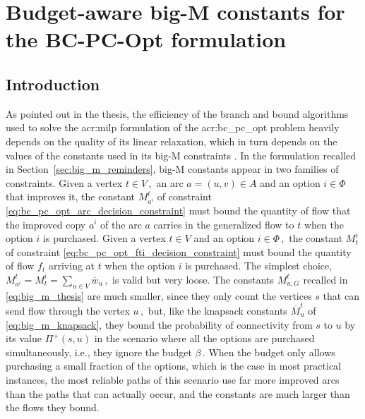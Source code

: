 \documentclass[11pt,a4paper]{report}
\theoremstyle{definition}
\theoremstyle{remark}
\begin{document}
\chapter{Budget-aware big-M constants for the BC-PC-Opt formulation}\label{chap:big_m}


\section{Introduction}\label{sec:big_m_introduction}

As pointed out in the thesis, the efficiency of the branch and bound algorithms used to solve the \gls{acr:milp} formulation of the \gls{acr:bc_pc_opt} problem heavily depends on the quality of its linear relaxation, which in turn depends on the values of the constants used in its big-M constraints \cite{BIG-M_BELOTTI_2016}. In the formulation recalled in Section~\ref{sec:big_m_reminders}, big-M constants appear in two families of constraints. Given a vertex $t \in V\,,$ an arc $a = (u,v) \in A$ and an option $i \in \Phi$ that improves it, the constant $M^t_{a^i}$ of constraint \eqref{eq:bc_pc_opt_arc_decision_constraint} must bound the quantity of flow that the improved copy $a^i$ of the arc $a$ carries in the generalized flow to $t$ when the option $i$ is purchased. Given a vertex $t \in V$ and an option $i \in \Phi\,,$ the constant $M^i_t$ of constraint \eqref{eq:bc_pc_opt_fti_decision_constraint} must bound the quantity of flow $f_t$ arriving at $t$ when the option $i$ is purchased. The simplest choice, $M^t_{a^i} = M^i_t = \sum_{u \in V} \overline{w}_u\,,$ is valid but very loose. The constants $M^t_{u,G}$ recalled in \eqref{eq:big_m_thesis} are much smaller, since they only count the vertices $s$ that can send flow through the vertex $u\,,$ but, like the knapsack constants $\overline{M}^t_u$ of \eqref{eq:big_m_knapsack}, they bound the probability of connectivity from $s$ to $u$ by its value $\Pi^+(s,u)$ in the scenario where all the options are purchased simultaneously, i.e., they ignore the budget $\beta\,.$ When the budget only allows purchasing a small fraction of the options, which is the case in most practical instances, the most reliable paths of this scenario use far more improved arcs than the paths that can actually occur, and the constants are much larger than the flows they bound.
\end{document}
